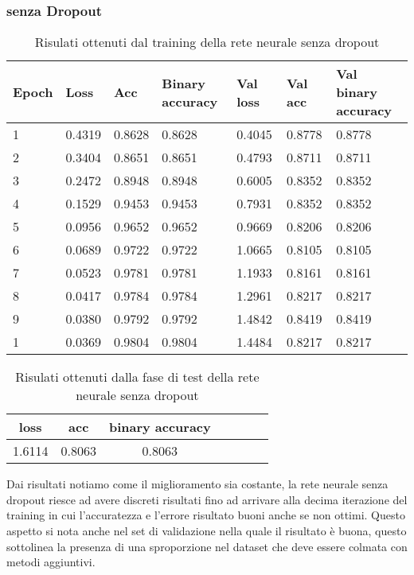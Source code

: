 \subsubsection{senza Dropout}
\renewcommand{\arraystretch}{1.4}
\begin{table}[H]
	\begin{center}
		\begin{tabular}{|p{1.2cm}|p{1.2cm}|p{1.2cm}|p{2cm}|p{1.2cm}|p{1.2cm}|p{2.5cm}|}
			\hline
			\textbf{Epoch} & \textbf{Loss}    & \textbf{Acc} & \textbf{Binary accuracy} & \textbf{Val loss} & \textbf{Val acc} & \textbf{Val binary accuracy}\\ \hline
			1 & 0.4319 & 0.8628 & 0.8628 & 0.4045 & 0.8778 & 0.8778 \\ \hline
			2 & 0.3404 & 0.8651 & 0.8651 & 0.4793 & 0.8711 & 0.8711 \\ \hline
			3 & 0.2472 & 0.8948 & 0.8948 & 0.6005 & 0.8352 & 0.8352 \\ \hline
			4 & 0.1529 & 0.9453 & 0.9453 & 0.7931 & 0.8352 & 0.8352 \\ \hline
			5 & 0.0956 & 0.9652 & 0.9652 & 0.9669 & 0.8206 & 0.8206 \\ \hline
			6 & 0.0689 & 0.9722 & 0.9722 & 1.0665 & 0.8105 & 0.8105 \\ \hline
			7 & 0.0523 & 0.9781 & 0.9781 & 1.1933 & 0.8161 & 0.8161 \\ \hline
			8 & 0.0417 & 0.9784 & 0.9784 & 1.2961 & 0.8217 & 0.8217 \\ \hline
			9 & 0.0380 & 0.9792 & 0.9792 & 1.4842 & 0.8419 & 0.8419 \\ \hline
			1 & 0.0369 & 0.9804 & 0.9804 & 1.4484 & 0.8217 & 0.8217 \\ \hline
		\end{tabular}
		\caption{Risulati ottenuti dal training della rete neurale senza dropout\label{}}
	\end{center}
\end{table}
\renewcommand{\arraystretch}{1}
\renewcommand{\arraystretch}{1.4}
\begin{table}[H]
	\begin{center}
		\begin{tabular}{|c|c|c|c|c|c|c|}
			\hline
			\textbf{loss} & \textbf{acc} & \textbf{binary accuracy} \\ \hline
			1.6114  & 0.8063 & 0.8063 \\ \hline
		\end{tabular}
		\caption{Risulati ottenuti dalla fase di test della rete neurale senza dropout\label{}}
	\end{center}
\end{table}
\renewcommand{\arraystretch}{1}
Dai risultati notiamo come il miglioramento sia costante, la rete neurale senza dropout riesce ad avere discreti risultati fino ad arrivare alla decima iterazione del training in cui l'accuratezza e l'errore risultato buoni anche se non ottimi.
Questo aspetto si nota anche nel set di validazione nella quale il risultato è buona, questo sottolinea la presenza di una sproporzione nel dataset che deve essere colmata con metodi aggiuntivi.

